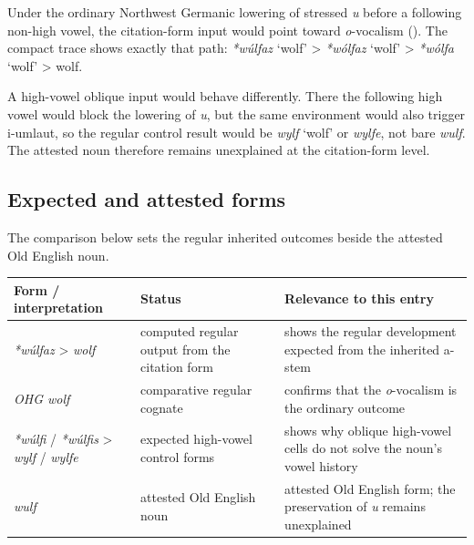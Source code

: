 \documentclass[
  british,
  a4paper,
  openany]{book}
\newcounter{none} %
\providecommand{\Recon}[1]{\emph{*#1}}
{\catcode`→=\active \global\def→{\ensuremath{\rightarrow}}}
\providecommand{\Recon}[1]{\emph{*#1}}
{\catcode`→=\active \global\def→{\ensuremath{\rightarrow}}}
\begin{document}
Under the ordinary Northwest Germanic lowering of stressed \emph{u}
before a following non-high vowel, the citation-form input would point
toward \emph{o}-vocalism (). The compact trace shows exactly that path:
\Recon{wúlfaz} `wolf' \textgreater{} \Recon{wólfaz} `wolf'
\textgreater{} \Recon{wólfa} `wolf' \textgreater{} wolf.

A high-vowel oblique input would behave differently. There the following
high vowel would block the lowering of \emph{u}, but the same
environment would also trigger i-umlaut, so the regular control result
would be {\emph{wylf}} `wolf' or \emph{wylfe}, not bare \emph{wulf}. The
attested noun therefore remains unexplained at the citation-form level.

\subsection{Expected and attested
forms}\label{expected-and-attested-forms-2}

The comparison below sets the regular inherited outcomes beside the
attested Old English noun.

{\def\LTcaptype{none} %
\begin{longtable}[]{@{}
  >{\raggedright\arraybackslash}p{}
  >{\raggedright\arraybackslash}p{}
  >{\raggedright\arraybackslash}p{}@{}}
\toprule\noalign{}
\begin{minipage}[b]{\linewidth}\raggedright
Form / interpretation
\end{minipage} & \begin{minipage}[b]{\linewidth}\raggedright
Status
\end{minipage} & \begin{minipage}[b]{\linewidth}\raggedright
Relevance to this entry
\end{minipage} \\
\midrule\noalign{}
\endhead
\bottomrule\noalign{}
\endlastfoot
\emph{*wúlfaz} \textgreater{} \emph{wolf} & computed regular output from
the citation form & shows the regular development expected from the
inherited a-stem \\
\emph{OHG wolf} & comparative regular cognate & confirms that the
\emph{o}-vocalism is the ordinary outcome \\
\emph{*wúlfi} / \emph{*wúlfis} \textgreater{} \emph{wylf} / \emph{wylfe}
& expected high-vowel control forms & shows why oblique high-vowel cells
do not solve the noun's vowel history \\
\emph{wulf} & attested Old English noun & attested Old English form; the
preservation of \emph{u} remains unexplained \\
\end{longtable}
}
\end{document}
